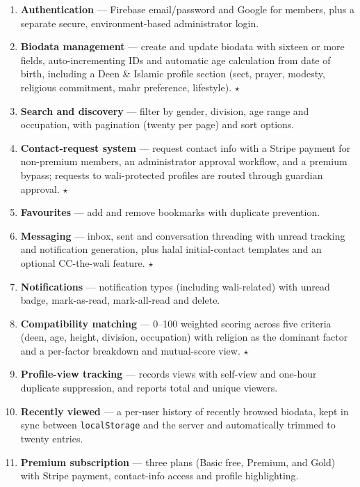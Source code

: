 \documentclass[12pt,a4paper]{report}
\begin{document}
\begin{enumerate}
  \item \textbf{Authentication} --- Firebase email/password and Google for
        members, plus a separate secure, environment-based administrator login.
  \item \textbf{Biodata management} --- create and update biodata with sixteen
        or more fields, auto-incrementing IDs and automatic age calculation
        from date of birth, including a Deen \& Islamic profile section
        (sect, prayer, modesty, religious commitment, mahr preference, lifestyle).
        $\star$
  \item \textbf{Search and discovery} --- filter by gender, division, age range
        and occupation, with pagination (twenty per page) and sort options.
  \item \textbf{Contact-request system} --- request contact info with a Stripe
        payment for non-premium members, an administrator approval workflow,
        and a premium bypass; requests to wali-protected profiles are routed
        through guardian approval. $\star$
  \item \textbf{Favourites} --- add and remove bookmarks with duplicate
        prevention.
  \item \textbf{Messaging} --- inbox, sent and conversation threading with
        unread tracking and notification generation, plus halal initial-contact
        templates and an optional CC-the-wali feature. $\star$
  \item \textbf{Notifications} --- notification types (including wali-related)
        with unread badge, mark-as-read, mark-all-read and delete.
  \item \textbf{Compatibility matching} --- 0--100 weighted scoring across five
        criteria (deen, age, height, division, occupation) with religion as the
        dominant factor and a per-factor breakdown and mutual-score view.
        $\star$
  \item \textbf{Profile-view tracking} --- records views with self-view and
        one-hour duplicate suppression, and reports total and unique viewers.
  \item \textbf{Recently viewed} --- a per-user history of recently browsed
        biodata, kept in sync between \texttt{localStorage} and the server and
        automatically trimmed to twenty entries.
  \item \textbf{Premium subscription} --- three plans (Basic free, Premium, and
        Gold) with Stripe payment, contact-info access and profile highlighting.

\end{enumerate}
\end{document}
